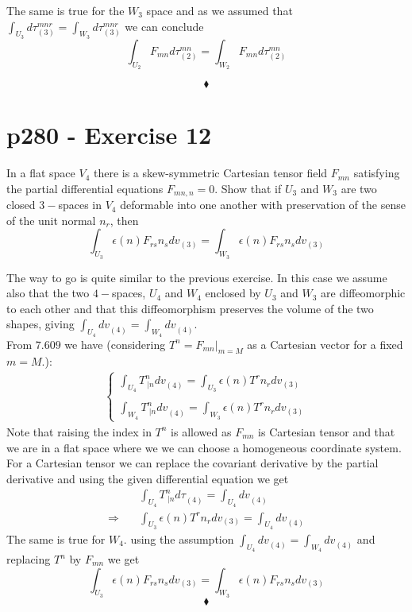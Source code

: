 The same is true for the $W_3$ space and as we assumed that  $\int_{U_3} d\tau_{(3)}^{mnr}=\int_{W_3}d\tau_{(3)}^{mnr}$ we can conclude 
$$\int_{U_2} F_{mn}d\tau_{(2)}^{mn}=\int_{W_2} F_{mn}d\tau_{(2)}^{mn}$$

$$\blacklozenge$$
\newpage


\section{p280 - Exercise 12}
\begin{tcolorbox}
In a flat space $V_4$ there is a skew-symmetric Cartesian tensor field $F_{mn}$ satisfying the partial differential equations $F_{mn,n}=0$. Show that if $U_3$ and $W_3$ are two closed $3-$spaces in $V_4$ deformable into one another with preservation of the sense of the unit normal $n_r$, then 
$$ \int_{U_3} \epsilon (n)F_{rs}n_sdv_{(3)} = \int_{W_3} \epsilon (n)F_{rs}n_sdv_{(3)}$$
\end{tcolorbox}
The way to go is quite similar to the previous exercise. In this case we assume also that the two $4-$spaces, $U_4$ and $W_4$ enclosed by $U_3$ and $W_3$ are diffeomorphic to each other and that this diffeomorphism preserves the volume of the two shapes, giving $\int_{U_4} dv_{(4)}^{}=\int_{W_4}dv_{(4)}^{}$. \\
From $\mathbf{7.609}$ we have (considering $T^n = \left.F_{mn}\right|_{m=M}$ as a Cartesian vector for a fixed $m=M$.): 
\begin{align}
\left\{\begin{array}{l}
\int_{U_4} T^n_{\ |n}dv_{(4)}^{} = \int_{U_3} \epsilon (n)T^rn_rdv_{(3)} \\\\
\int_{W_4} T^n_{\ |n}dv_{(4)}^{} = \int_{W_3} \epsilon (n)T^rn_rdv_{(3)} 
\end{array}\right.
\end{align}
Note that raising the index in $T^n$ is allowed as $F_{mn}$ is Cartesian tensor and that we are in a flat space where we we can choose a homogeneous coordinate system. For a Cartesian tensor we can replace the covariant derivative by the partial derivative and using the given differential equation we get
\begin{align}
&\int_{U_4} T^n_{\ |n}d\tau_{(4)}^{} =\int_{U_4} dv_{(4)}^{}\\
\Rightarrow \quad &\int_{U_3} \epsilon (n)T^r n_rdv_{(3)}  = \int_{U_4} dv_{(4)}^{}
\end{align}
The same is true for $W_4$. using the assumption $\int_{U_4} dv_{(4)}^{}=\int_{W_4}dv_{(4)}^{}$ and replacing $T^n$ by $F_{mn}$ we get $$ \int_{U_3} \epsilon (n)F_{rs}n_sdv_{(3)} = \int_{W_3} \epsilon (n)F_{rs}n_sdv_{(3)}$$
$$\blacklozenge$$
\newpage

